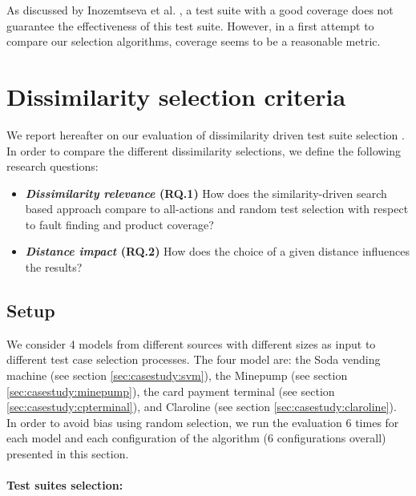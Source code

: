 As discussed by Inozemtseva et al. \cite{Inozemtseva2014}, a test suite with a good coverage does not guarantee the effectiveness of this test suite. However, in a first attempt to compare our selection algorithms, coverage seems to be a reasonable metric.


\section{Dissimilarity selection criteria}

\label{sec:experiment:dissimilarity}

We report hereafter on our evaluation of dissimilarity driven test suite selection \cite{Devroey2016}. In order to compare the different dissimilarity selections, we define the following research questions:
\begin{itemize}
\item \textbf{\textit{Dissimilarity relevance} (RQ.1) } How does the similarity-driven search based approach compare to all-actions and random test selection with respect to fault finding and product coverage?
\item \textbf{\textit{Distance impact} (RQ.2) } How does the choice of a given distance influences the results?
\end{itemize}


\subsection{Setup}

\label{sec:assessment:dissimilarity:setup}

We consider 4 models from different sources with different sizes as input to different test case selection processes. The four model are: the Soda vending machine (see section \ref{sec:casestudy:svm}), the Minepump (see section \ref{sec:casestudy:minepump}), the card payment terminal (see section \ref{sec:casestudy:cpterminal}), and Claroline (see section \ref{sec:casestudy:claroline}). In order to avoid bias using random selection, we run the evaluation 6 times for each model and each configuration of the algorithm (6 configurations overall) presented in this section.

\paragraph{Test suites selection:}

